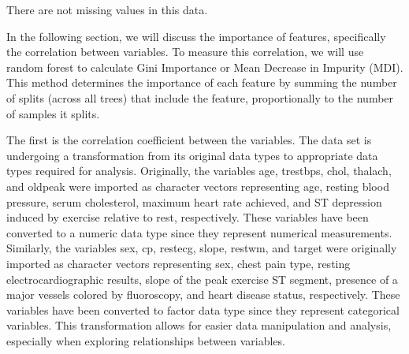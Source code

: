 \documentclass[
]{article}
\begin{document}
There are not missing values in this data.

In the following section, we will discuss the importance of features,
specifically the correlation between variables. To measure this
correlation, we will use random forest to calculate Gini Importance or
Mean Decrease in Impurity (MDI). This method determines the importance
of each feature by summing the number of splits (across all trees) that
include the feature, proportionally to the number of samples it splits.

The first is the correlation coefficient between the variables. The data
set is undergoing a transformation from its original data types to
appropriate data types required for analysis. Originally, the variables
age, trestbps, chol, thalach, and oldpeak were imported as character
vectors representing age, resting blood pressure, serum cholesterol,
maximum heart rate achieved, and ST depression induced by exercise
relative to rest, respectively. These variables have been converted to a
numeric data type since they represent numerical measurements.
Similarly, the variables sex, cp, restecg, slope, restwm, and target
were originally imported as character vectors representing sex, chest
pain type, resting electrocardiographic results, slope of the peak
exercise ST segment, presence of a major vessels colored by fluoroscopy,
and heart disease status, respectively. These variables have been
converted to factor data type since they represent categorical
variables. This transformation allows for easier data manipulation and
analysis, especially when exploring relationships between variables.
\end{document}
